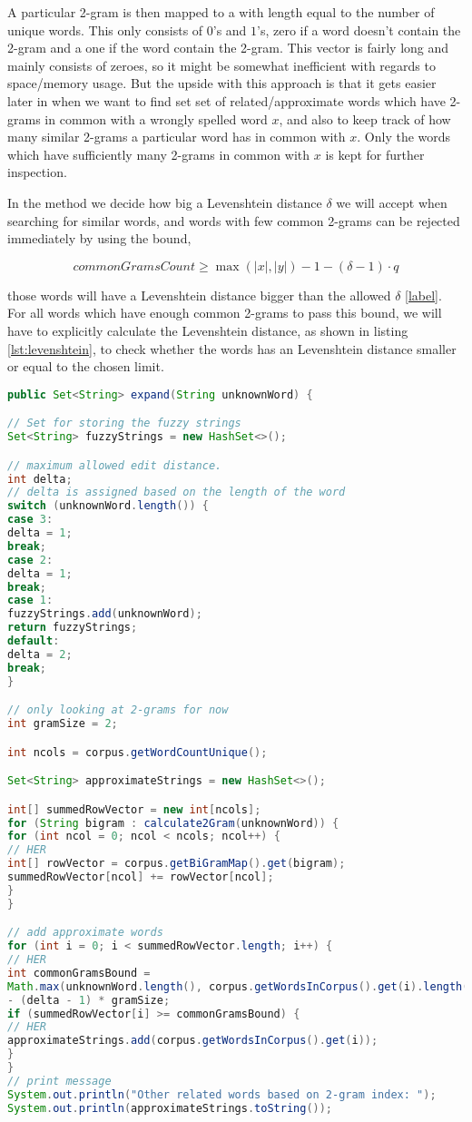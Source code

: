 A particular 2-gram is then mapped to a  with length equal to the number of unique words. This  only consists of \(0\)'s and \(1\)'s, zero if a word doesn't contain the 2-gram and a one if the word contain the 2-gram.
This vector is fairly long and mainly consists of zeroes, so it might be somewhat inefficient with regards to space/memory usage. 
But the upside with this approach is that it gets easier later in  when we want to find set set of related/approximate words which have 2-grams in common with a wrongly spelled word \(x\), and also to keep track of how many similar 2-grams a particular word has in common with \(x\). Only the words which have sufficiently many 2-grams in common with \(x\) is kept for further inspection. 

In the  method we decide how big a Levenshtein distance \(\delta\) we will accept when searching for similar words, and words with few common 2-grams can be rejected immediately by using the bound,

\[ commonGramsCount \geq \max{(|x|, |y|) - 1 - (\delta -1 ) \cdot q } \]   

those words will have a Levenshtein distance bigger than the allowed \(\delta\) \ref{label}.  
For all words which have enough common 2-grams to pass this bound, we will have to explicitly calculate the Levenshtein distance, as shown in listing \ref{lst:levenshtein}, to check whether the words has an Levenshtein distance smaller or equal to the chosen limit. 



\begin{lstlisting}[language=Java, caption=This is a code example., label=lst:2-gram]
public Set<String> expand(String unknownWord) {

// Set for storing the fuzzy strings
Set<String> fuzzyStrings = new HashSet<>();

// maximum allowed edit distance.
int delta;
// delta is assigned based on the length of the word
switch (unknownWord.length()) {
case 3:
delta = 1;
break;
case 2:
delta = 1;
break;
case 1:
fuzzyStrings.add(unknownWord);
return fuzzyStrings;
default:
delta = 2;
break;
}

// only looking at 2-grams for now
int gramSize = 2;

int ncols = corpus.getWordCountUnique();

Set<String> approximateStrings = new HashSet<>();

int[] summedRowVector = new int[ncols];
for (String bigram : calculate2Gram(unknownWord)) {
for (int ncol = 0; ncol < ncols; ncol++) {
// HER
int[] rowVector = corpus.getBiGramMap().get(bigram);
summedRowVector[ncol] += rowVector[ncol];
}
}

// add approximate words
for (int i = 0; i < summedRowVector.length; i++) {
// HER
int commonGramsBound =
Math.max(unknownWord.length(), corpus.getWordsInCorpus().get(i).length()) - 1
- (delta - 1) * gramSize;
if (summedRowVector[i] >= commonGramsBound) {
// HER
approximateStrings.add(corpus.getWordsInCorpus().get(i));
}
}
// print message
System.out.println("Other related words based on 2-gram index: ");
System.out.println(approximateStrings.toString());
\end{lstlisting}


